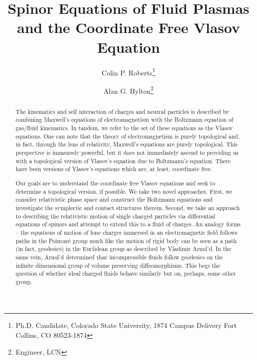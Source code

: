 \documentclass[conf]{new-aiaa}
\title{Spinor Equations of Fluid Plasmas and the Coordinate Free Vlasov Equation}
\author{Colin P. Roberts\footnote{Ph.D. Candidate, Colorado State University, 1874 Campus Delivery Fort Collins, CO 80523-1874}}
\affil{Colorado State University, Fort Collins, Colorado, 80523}
\author{Alan G. Hylton\footnote{Engineer, LCN}}
\affil{NASA Glenn Research Center, Cleveland, Ohio, 44133, USA}
\begin{document}
\maketitle

\begin{abstract}
The kinematics and self interaction of charges and neutral particles is described by combining Maxwell's equations of electromagnetism with the Boltzmann equation of gas/fluid kinematics. In tandem, we refer to the set of these equations as the Vlasov equations. One can note that the theory of electromagnetism is purely topological and, in fact, through the lens of relativity, Maxwell's equations are purely topological. This perspective is immensely powerful, but it does not immediately ascend to providing us with a topological version of Vlasov's equation due to Boltzmann's equation. There have been versions of Vlasov's equations which are, at least, coordinate free. 

Our goals are to understand the coordinate free Vlasov equations and seek to determine a topological version, if possible. We take two novel approaches. First, we consider relativistic phase space and construct the Boltzmann equations and investigate the symplectic and contact structures therein. Second, we take an approach to describing the relativistic motion of single charged particles via differential equations of spinors and attempt to extend this to a fluid of charges. An analogy forms -- the equations of motion of lone charges immersed in an electromagnetic field follows paths in the Poincar\'e group much like the motion of rigid body can be seen as a path (in fact, geodesics) in the Euclidean group as described by Vladimir Arnol'd. In the same vein, Arnol'd determined that incompressible fluids follow geodesics on the infinite dimensional group of volume preserving diffeomorphisms. This begs the question of whether ideal charged fluids behave similarly but on, perhaps, some other group.
\end{abstract}
\end{document}
